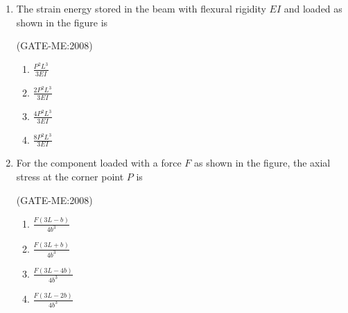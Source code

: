 \documentclass[journal,12pt,onecolumn]{IEEEtran}
\theoremstyle{remark}
\begin{document}
\begin{enumerate}
	     \hfill{(GATE-ME:2008)}

    \begin{multicols}{4}
        \begin{enumerate}
            \item 0
            \item 0.17
            \item 0.62
            \item 1.13
        \end{enumerate}
    \end{multicols}

    \item The strain energy stored in the beam with flexural rigidity $EI$ and loaded as shown in the figure is
	    \begin{center}
	    
	    \end{center}
 
 \hfill{(GATE-ME:2008)}
 \begin{multicols}{2}
	 \begin{enumerate}
	    \item $\frac{P^2 L^3}{3EI}$
            \item $\frac{2P^2 L^3}{3EI}$
            \item $\frac{4P^2 L^3}{3EI}$
            \item $\frac{8P^2 L^3}{3EI}$
	    
        \end{enumerate}
    \end{multicols}

    \item For the component loaded with a force $F$ as shown in the figure, the axial stress at the corner point $P$ is
	    \begin{center}
	    
	    \end{center}

	     \hfill{(GATE-ME:2008)}

       \begin{multicols}{4}
        \begin{enumerate}
            \item $\frac{F(3L-b)}{4b^3}$
            \item $\frac{F(3L+b)}{4b^3}$
            \item $\frac{F(3L-4b)}{4b^3}$
            \item $\frac{F(3L-2b)}{4b^3}$
        \end{enumerate}
    \end{multicols}


\end{enumerate}
\end{document}
